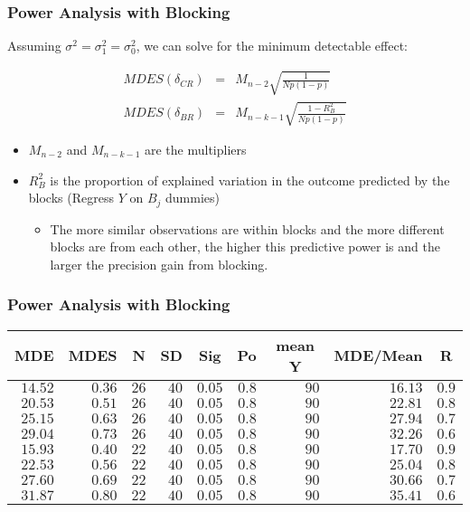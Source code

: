 \documentclass{beamer}
\numberwithin{equation}{section}
\begin{document}
\begin{frame}
  \frametitle{Power Analysis with Blocking}
\small
Assuming $\sigma^2=\sigma_1^2=\sigma_0^2$, we can solve for the \alert{minimum detectable effect}:

\begin{eqnarray}
MDES(\delta_{CR}) &=&  M_{n-2} \sqrt{\frac{1}{N p(1-p)}} \\
MDES(\delta_{BR}) &=& M_{n-k-1} \sqrt{\frac{1-R_B^2}{N p(1-p)}}
\end{eqnarray}
\begin{itemize}
  \item $M_{n-2}$ and $M_{n-k-1}$ are the multipliers
  \item $R_B^2$ is the proportion of explained variation in the outcome predicted by the blocks (Regress $Y$ on $B_j$ dummies)
  \begin{itemize}
    \item The more similar observations are within blocks and the more different
blocks are from each other, the higher this predictive power is and the larger the precision gain from blocking.
  \end{itemize}
\end{itemize}

\end{frame}

\begin{frame}
  \frametitle{Power Analysis with Blocking}

\begin{table}[!tbp]
 \begin{center}
 \begin{tabular}{rrrrrrrrr}\hline\hline
\multicolumn{1}{c}{MDE}&\multicolumn{1}{c}{MDES}&\multicolumn{1}{c}{N}&\multicolumn{1}{c}{SD}&\multicolumn{1}{c}{Sig}&\multicolumn{1}{c}{Po}&\multicolumn{1}{c}{mean Y}&\multicolumn{1}{c}{MDE/Mean}&\multicolumn{1}{c}{R}\tabularnewline

\hline
$14.52$&$0.36$&$26$&$40$&$0.05$&$0.8$&$90$&$16.13$&$0.9$\tabularnewline
$20.53$&$0.51$&$26$&$40$&$0.05$&$0.8$&$90$&$22.81$&$0.8$\tabularnewline
$25.15$&$0.63$&$26$&$40$&$0.05$&$0.8$&$90$&$27.94$&$0.7$\tabularnewline
$29.04$&$0.73$&$26$&$40$&$0.05$&$0.8$&$90$&$32.26$&$0.6$\tabularnewline
\hline
$15.93$&$0.40$&$22$&$40$&$0.05$&$0.8$&$90$&$17.70$&$0.9$\tabularnewline
$22.53$&$0.56$&$22$&$40$&$0.05$&$0.8$&$90$&$25.04$&$0.8$\tabularnewline
$27.60$&$0.69$&$22$&$40$&$0.05$&$0.8$&$90$&$30.66$&$0.7$\tabularnewline
$31.87$&$0.80$&$22$&$40$&$0.05$&$0.8$&$90$&$35.41$&$0.6$\tabularnewline
\hline

\end{tabular}

\end{center}

\end{table}

\end{frame}
\end{document}
